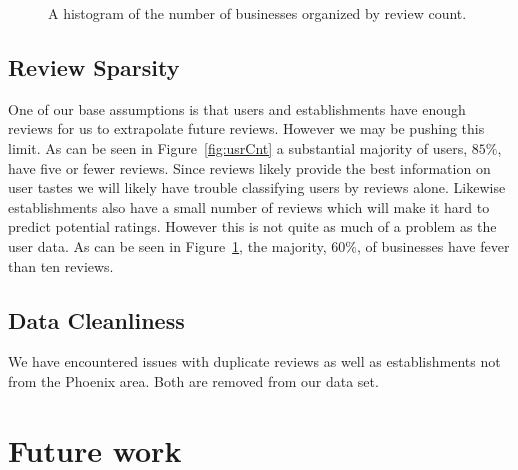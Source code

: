 \documentclass[10pt,twocolumn,letterpaper]{article}
\begin{document}
\begin{figure}[t]
\begin{center}
\end{center}
   \caption{A histogram of the number of businesses organized by review count.}
\label{fig:bizCnt}
\end{figure}

\subsection{Review Sparsity}
One of our base assumptions is that users and establishments have enough reviews for us to extrapolate future reviews. However we may be pushing this limit. As can be seen in Figure~\ref{fig:usrCnt} a substantial majority of users, $85\%$, have five or fewer reviews. Since reviews likely provide the best information on user tastes we will likely have trouble classifying users by reviews alone. Likewise establishments also have a small number of reviews which will make it hard to predict potential ratings. However this is not quite as much of a problem as the user data. As can be seen in Figure~\ref{fig:bizCnt}, the majority, $60\%$, of businesses have fever than ten reviews.


\subsection{Data Cleanliness}
We have encountered issues with duplicate reviews as well as establishments not from the Phoenix area. Both are removed from our data set.

\section{Future work}
\end{document}
